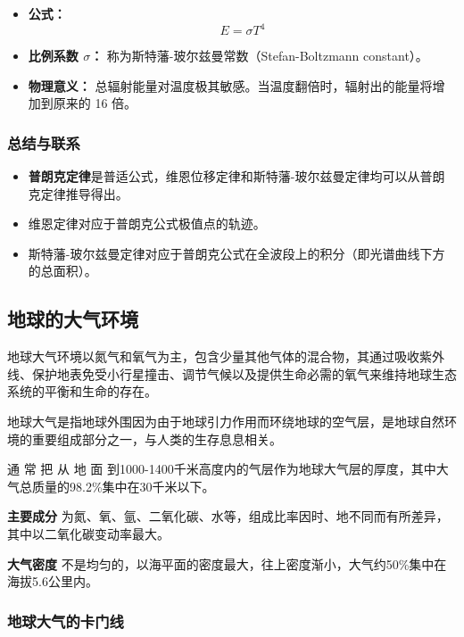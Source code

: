 \documentclass[12pt,a4paper]{article}
\begin{document}
	\begin{itemize}
		\item \textbf{公式：}
		\begin{equation}
			E = \sigma T^4
		\end{equation}
		\item \textbf{比例系数 $\sigma$：} 称为斯特藩-玻尔兹曼常数（Stefan-Boltzmann constant）。
		\item \textbf{物理意义：} 总辐射能量对温度极其敏感。当温度翻倍时，辐射出的能量将增加到原来的 16 倍。
	\end{itemize}
	
	\subsubsection{总结与联系}
	\begin{itemize}
		\item \textbf{普朗克定律}是普适公式，维恩位移定律和斯特藩-玻尔兹曼定律均可以从普朗克定律推导得出。
		\item 维恩定律对应于普朗克公式极值点的轨迹。
		\item 斯特藩-玻尔兹曼定律对应于普朗克公式在全波段上的积分（即光谱曲线下方的总面积）。
	\end{itemize}
	
	\subsection{地球的大气环境}
	
	地球大气环境以氮气和氧气为主，包含少量其他气体的混合物，其通过吸收紫外线、保护地表免受小行星撞击、调节气候以及提供生命必需的氧气来维持地球生态系统的平衡和生命的存在。
	
	地球大气是指地球外围因为由于地球引力作用而环绕地球的空气层，是地球自然环境的重要组成部分之一，与人类的生存息息相关。
	
	通 常 把 从 地 面 到1000-1400千米高度内的气层作为地球大气层的厚度，其中大气总质量的98.2\%集中在30千米以下。
	
	\textbf{主要成分} 为氮、氧、氩、二氧化碳、水等，组成比率因时、地不同而有所差异，其中以二氧化碳变动率最大。
	
	\textbf{大气密度} 不是均匀的，以海平面的密度最大，往上密度渐小，大气约50\%集中在海拔5.6公里内。
	
	\subsubsection{地球大气的卡门线}
	
\end{document}
